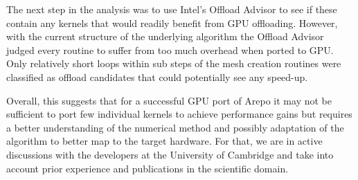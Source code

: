 The next step in the analysis was to use Intel's Offload Advisor to see if these contain any kernels that would readily benefit from GPU offloading. However, with the current structure of the underlying algorithm the Offload Advisor judged every routine to suffer from too much overhead when ported to GPU. Only relatively short loops within sub steps of the mesh creation routines were classified as offload candidates that could potentially see any speed-up.

Overall, this suggests that for a successful GPU port of Arepo it may not be sufficient to port few individual kernels to achieve performance gains but requires a better understanding of the numerical method and possibly adaptation of the algorithm to better map to the target hardware. For that, we are in active discussions with the developers at the University of Cambridge and take into account prior experience and publications in the scientific domain.

